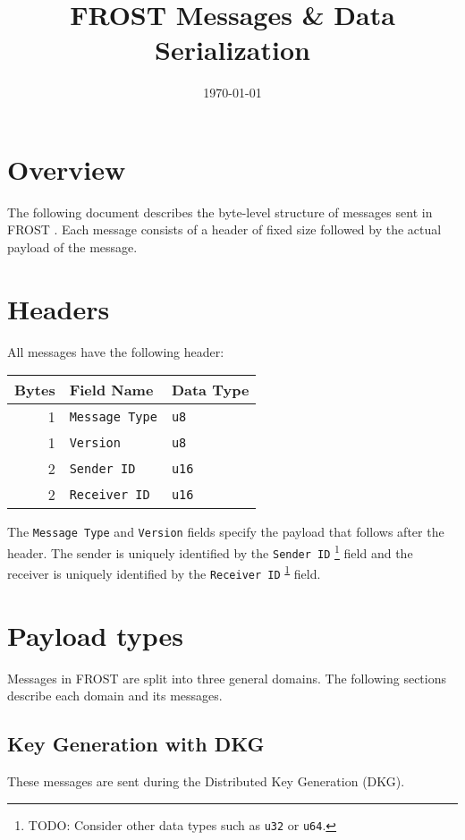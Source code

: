 \documentclass[11pt]{article}
\date{\today}
\title{FROST Messages \& Data Serialization}
\begin{document}
\maketitle
\tableofcontents


\section{Overview}
\label{sec:org912bf34}
The following document describes the byte-level structure of messages sent in
FROST \cite{frost}. Each message consists of a header of fixed size followed by
the actual payload of the message.

\section{Headers}
\label{sec:org12fae35}
All messages have the following header:

\begin{center}
\begin{tabular}{rll}
Bytes & Field Name & Data Type\\
\hline
1 & \texttt{Message Type} & \texttt{u8}\\
1 & \texttt{Version} & \texttt{u8}\\
2 & \texttt{Sender ID} & \texttt{u16}\\
2 & \texttt{Receiver ID} & \texttt{u16}\\
\end{tabular}
\end{center}

The \texttt{Message Type} and \texttt{Version} fields specify the payload that follows after
the header. The sender is uniquely identified by the \texttt{Sender ID} \footnote{TODO: Consider other data types such as \texttt{u32} or \texttt{u64}.\label{org68e5745}} field
and the receiver is uniquely identified by the \texttt{Receiver ID} \textsuperscript{\ref{org68e5745}} field.

\section{Payload types}
\label{sec:org09c501d}
Messages in FROST are split into three general domains. The following sections
describe each domain and its messages.

\subsection{Key Generation with DKG}
\label{sec:org9fbd07e}
These messages are sent during the Distributed Key Generation (DKG).
\end{document}
